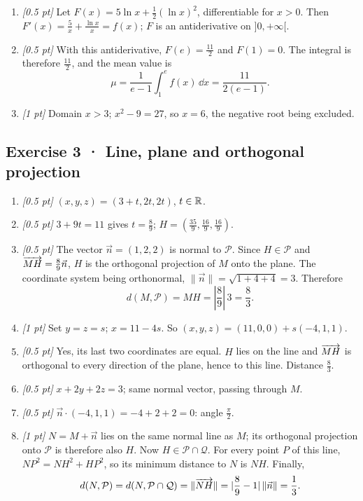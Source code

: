 \begin{enumerate}
\item \textit{[0.5 pt]} Let $F(x)=5\ln x+\frac12(\ln x)^2$, differentiable for $x>0$. Then $F'(x)=\frac{5}{x}+\frac{\ln x}{x}=f(x)$; $F$ is an antiderivative on $]0,+\infty[$.

\item \textit{[0.5 pt]} With this antiderivative, $F(e)=\frac{11}{2}$ and $F(1)=0$. The integral is therefore $\frac{11}{2}$, and the mean value is
\[\mu=\frac{1}{e-1}\int_1^e f(x)\,\dd x=\frac{11}{2(e-1)}.\]

\item \textit{[1 pt]} Domain $x>3$; $x^2-9=27$, so $x=6$, the negative root being excluded.

\end{enumerate}

\subsection*{Exercise 3 · Line, plane and orthogonal projection}\begin{enumerate}

\item \textit{[0.5 pt]} $(x,y,z)=(3+t,2t,2t)$, $t\in\mathbb R$.

\item \textit{[0.5 pt]} $3+9t=11$ gives $t=\frac{8}{9}$; $H=(\frac{35}{9},\frac{16}{9},\frac{16}{9})$.

\item \textit{[0.5 pt]} The vector $\vec n=(1,2,2)$ is normal to $\mathcal P$. Since $H\in\mathcal P$ and $\overrightarrow{MH}=\frac{8}{9}\vec n$, $H$ is the orthogonal projection of $M$ onto the plane. The coordinate system being orthonormal, $\|\vec n\|=\sqrt{1+4+4}=3$. Therefore
\[d(M,\mathcal P)=MH=|\frac{8}{9}|\,3=\frac{8}{3}.\]

\item \textit{[1 pt]} Set $y=z=s$; $x=11-4s$. So $(x,y,z)=(11,0,0)+s(-4,1,1)$.

\item \textit{[0.5 pt]} Yes, its last two coordinates are equal. $H$ lies on the line and $\overrightarrow{MH}$ is orthogonal to every direction of the plane, hence to this line. Distance $\frac{8}{3}$.

\item \textit{[0.5 pt]} $x+2y+2z=3$; same normal vector, passing through $M$.

\item \textit{[0.5 pt]} $\vec n\cdot(-4,1,1)=-4+2+2=0$: angle $\frac{\pi}{2}$.

\item \textit{[1 pt]} $N=M+\vec n$ lies on the same normal line as $M$; its orthogonal projection onto $\mathcal P$ is therefore also $H$. Now $H\in\mathcal P\cap\mathcal Q$. For every point $P$ of this line, $NP^2=NH^2+HP^2$, so its minimum distance to $N$ is $NH$. Finally,
\[d(N,\mathcal P)=d(N,\mathcal P\cap\mathcal Q)=\|\overrightarrow{NH}\|=|\frac{8}{9}-1|\,\|\vec n\|=\frac{1}{3}.\]

\end{enumerate}

